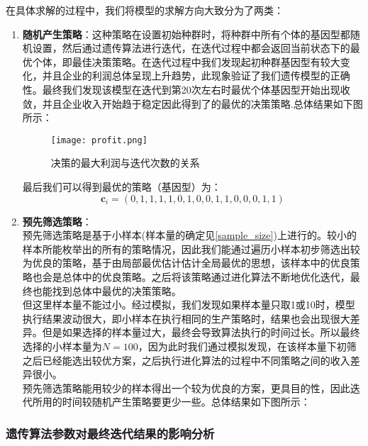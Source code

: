 \documentclass[utf8]{ctexart} %
\begin{document}
		在具体求解的过程中，我们将模型的求解方向大致分为了两类：
		\begin{enumerate}[itemsep=0pt, parsep=0pt, label=(\arabic*)] 
			\item \textbf{随机产生策略}：这种策略在设置初始种群时，将种群中所有个体的基因型都随机设置，然后通过遗传算法进行迭代，在迭代过程中都会返回当前状态下的最优个体，即最佳决策策略。在迭代过程中我们发现起初种群基因型有较大变化，并且企业的利润总体呈现上升趋势，此现象验证了我们遗传模型的正确性。最终我们发现该模型在迭代到第20次左右时最优个体基因型开始出现收敛，并且企业收入开始趋于稳定因此得到了的最优的决策策略.总体结果如下图所示：
			
			
			
			\begin{figure}[H] %
				\centering
				\texttt{[image: profit.png]}
				\caption{决策的最大利润与迭代次数的关系}
				\label{fig:label}
			\end{figure}
			
			最后我们可以得到最优的策略（基因型）为：
			\[  
			\mathbf{c}_i = (0, 1, 1, 1, 1, 0, 1, 0, 0, 1, 1, 0, 0, 0, 1, 1)  
			\]  
			
			\item \textbf{预先筛选策略}：\\
			预先筛选策略是基于小样本(样本量的确定见\ref{sample_size})上进行的。较小的样本所能枚举出的所有的策略情况，因此我们能通过遍历小样本初步筛选出较为优良的策略，基于由局部最优估计估计全局最优的思想，该样本中的优良策略也会是总体中的优良策略。之后将该策略通过进化算法不断地优化迭代，最终也能找到总体中最优的决策策略。\\
			
			
			但这里样本量不能过小。经过模拟，我们发现如果样本量只取1或10时，模型执行结果波动很大，即小样本在执行相同的生产策略时，结果也会出现很大差异。但是如果选择的样本量过大，最终会导致算法执行的时间过长。所以最终选择的小样本量为$N=100$，因为此时我们通过模拟发现，在该样本量下初筛之后已经能选出较优方案，之后执行进化算法的过程中不同策略之间的收入差异很小。\\
			
			
			预先筛选策略能用较少的样本得出一个较为优良的方案，更具目的性，因此迭代所用的时间较随机产生策略要更少一些。总体结果如下图所示：
			
			
		\end{enumerate}
		
		\subsubsection{遗传算法参数对最终迭代结果的影响分析}  
		
\end{document}

